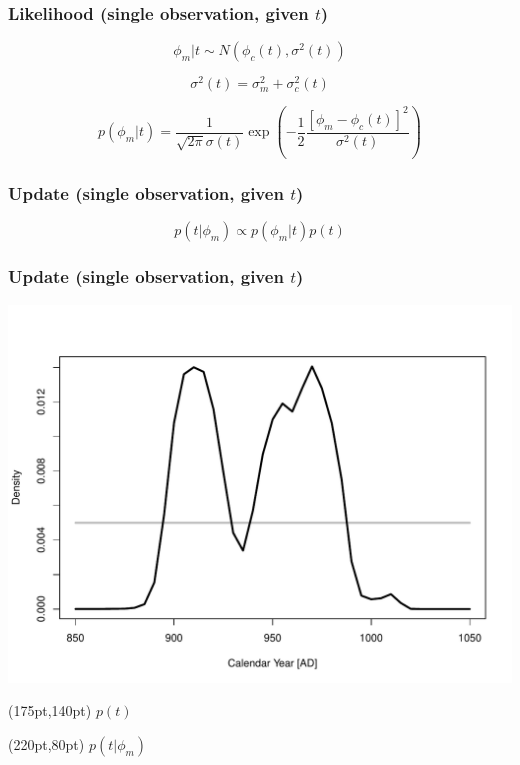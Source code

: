 \documentclass{beamer}
\begin{document}
\begin{frame}[t]
  \frametitle{Likelihood (single observation, given $t$)}
  \Large
  \begin{equation}
    \phi_m|t \sim N(\phi_c(t),\sigma^2(t))
  \end{equation}
  
  \bigskip
  
  \begin{equation}
    \sigma^2(t) = \sigma^2_m + \sigma^2_c(t)
  \end{equation}
  
  \bigskip
  
  \begin{equation}
    p(\phi_m|t) = \frac{1}{\sqrt{2\pi}\sigma(t)}\exp{(-\frac{1}{2}\frac{[\phi_m-\phi_c(t)]^2}{\sigma^2(t)})}
  \end{equation}
 
  \normalsize
\end{frame}

\begin{frame}[t]
  \frametitle{Update (single observation, given $t$)}
  \Large
  \begin{equation}
    p(t|\phi_m) \propto p(\phi_m|t) p(t)
  \end{equation}
  \normalsize
\end{frame}

\begin{frame}[t]
  \frametitle{Update (single observation, given $t$)}
    \includegraphics[height=.85\textheight]{single_obs_inf_plot3.pdf}
    \begin{textblock*}{100pt}(175pt,140pt)
      \Large $p(t)$ \normalsize
	\end{textblock*}
    \begin{textblock*}{100pt}(220pt,80pt)
      \Large $p(t|\phi_m)$ \normalsize
	\end{textblock*}
\end{frame}
\end{document}
